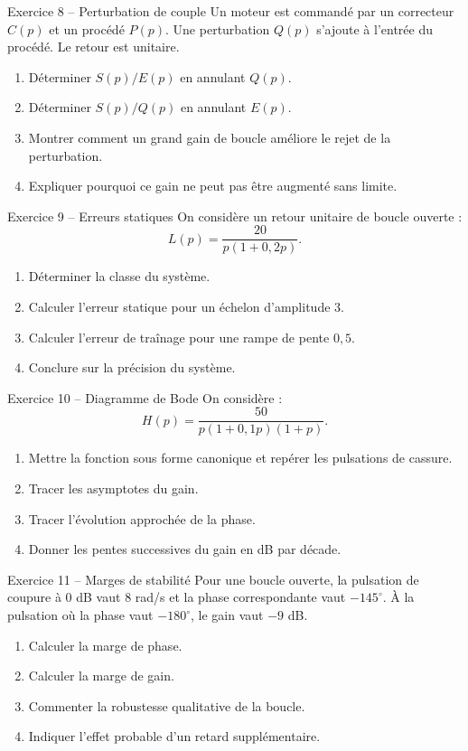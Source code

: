 \begin{TLExercise}{Exercice 8 -- Perturbation de couple}
Un moteur est commandé par un correcteur $C(p)$ et un procédé $P(p)$. Une perturbation $Q(p)$ s'ajoute à l'entrée du procédé. Le retour est unitaire.
\begin{enumerate}
  \item Déterminer $S(p)/E(p)$ en annulant $Q(p)$.
  \item Déterminer $S(p)/Q(p)$ en annulant $E(p)$.
  \item Montrer comment un grand gain de boucle améliore le rejet de la perturbation.
  \item Expliquer pourquoi ce gain ne peut pas être augmenté sans limite.
\end{enumerate}
\end{TLExercise}

\begin{TLExercise}{Exercice 9 -- Erreurs statiques}
On considère un retour unitaire de boucle ouverte :
\[
L(p)=\frac{20}{p(1+0{,}2p)}.
\]
\begin{enumerate}
  \item Déterminer la classe du système.
  \item Calculer l'erreur statique pour un échelon d'amplitude 3.
  \item Calculer l'erreur de traînage pour une rampe de pente $0{,}5$.
  \item Conclure sur la précision du système.
\end{enumerate}
\end{TLExercise}

\begin{TLExercise}{Exercice 10 -- Diagramme de Bode}
On considère :
\[
H(p)=\frac{50}{p(1+0{,}1p)(1+p)}.
\]
\begin{enumerate}
  \item Mettre la fonction sous forme canonique et repérer les pulsations de cassure.
  \item Tracer les asymptotes du gain.
  \item Tracer l'évolution approchée de la phase.
  \item Donner les pentes successives du gain en dB par décade.
\end{enumerate}
\end{TLExercise}

\begin{TLExercise}{Exercice 11 -- Marges de stabilité}
Pour une boucle ouverte, la pulsation de coupure à 0 dB vaut $8$ rad/s et la phase correspondante vaut $-145^\circ$. À la pulsation où la phase vaut $-180^\circ$, le gain vaut $-9$ dB.
\begin{enumerate}
  \item Calculer la marge de phase.
  \item Calculer la marge de gain.
  \item Commenter la robustesse qualitative de la boucle.
  \item Indiquer l'effet probable d'un retard supplémentaire.
\end{enumerate}
\end{TLExercise}

